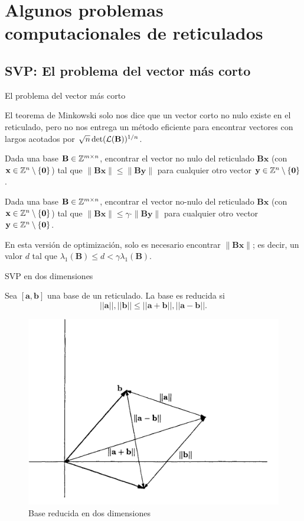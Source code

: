 \section{Algunos problemas computacionales de reticulados}

\subsection{SVP: El problema del vector más corto}
\begin{frame}{El problema del vector más corto}

El teorema de Minkowski solo nos dice que un vector corto no nulo existe en el reticulado, pero no nos entrega un método eficiente para encontrar vectores con largos acotados por $\sqrt{n}\det(\mathbf{\mathcal{L}(\mathbf{B})})^{1/n}$.

\begin{definition}
Dada una base $\mathbf{B}\in \mathbb{Z}^{m\times n}$, encontrar el vector no nulo del reticulado $\mathbf{Bx}$ (con $\mathbf{x}\in\mathbb{Z}^n\setminus\{\mathbf{0}\}$) tal que $\|\mathbf{Bx}\| \leq \|\mathbf{By}\|$ para cualquier otro vector $\mathbf{y}\in\mathbb{Z}^n\setminus\{\mathbf{0}\}$. 
\end{definition}

\begin{definition}
Dada una base $\mathbf{B}\in \mathbb{Z}^{m\times n}$, encontrar el vector no-nulo del reticulado $\mathbf{Bx}$ (con $\mathbf{x}\in\mathbb{Z}^n\setminus\{\mathbf{0}\}$) tal que $\|\mathbf{Bx}\| \leq \gamma \cdot \|\mathbf{By}\|$ para cualquier otro vector $\mathbf{y}\in\mathbb{Z}^n\setminus\{\mathbf{0}\}$.
\end{definition}

En esta versión de optimización, solo es necesario encontrar $\|\mathbf{Bx}\|$; es decir, un valor $d$ tal que $\lambda_1(\mathbf{B}) \leq d < \gamma\lambda_1(\mathbf{B})$.
\end{frame}

\begin{frame}{SVP en dos dimensiones}
    \begin{definition}
        Sea $[\textbf{a},\textbf{b}]$ una base de un reticulado. La base es reducida si
        \[
            ||\textbf{a}||,||\textbf{b}|| \leq ||\textbf{a}+\textbf{b}||,||\textbf{a}-\textbf{b}|| \text{.}
        \]
        \begin{figure}
            \centering
            \includegraphics[width=0.5\linewidth]{figures/baseReducida.png}
            \caption{Base reducida en dos dimensiones}
        \end{figure}
    \end{definition}
\end{frame}


